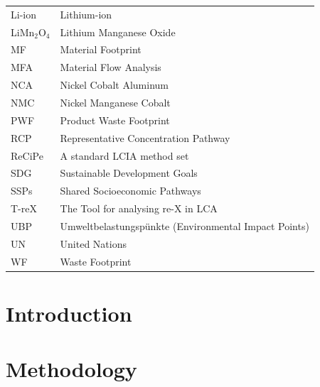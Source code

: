 \documentclass[review,3p,authoryear]{elsarticle}
\begin{document}
\begin{table}[H]
\begin{tabular}{ll}
        Li-ion            & Lithium-ion                                                         \\
        LiMn\(_2\)O\(_4\) & Lithium Manganese Oxide                                             \\
        MF                & Material Footprint                                                  \\
        MFA               & Material Flow Analysis                                              \\
        NCA               & Nickel Cobalt Aluminum                                              \\
        NMC               & Nickel Manganese Cobalt                                             \\
        PWF               & Product Waste Footprint                                             \\
        RCP               & Representative Concentration Pathway                                \\
        ReCiPe            & A standard LCIA method set                                          \\
        SDG               & Sustainable Development Goals                                       \\
        SSPs              & Shared Socioeconomic Pathways                                       \\
        T-reX             & The Tool for analysing re-X in LCA                                  \\
        UBP               & Umweltbelastungspünkte (Environmental Impact Points)                \\
        UN                & United Nations                                                      \\
        WF                & Waste Footprint                                                     \\
        \bottomrule
    \end{tabular}
\end{table}

\section{Introduction}\label{sec:introduction}


\section{Methodology}\label{sec:methodology}

\end{document}
